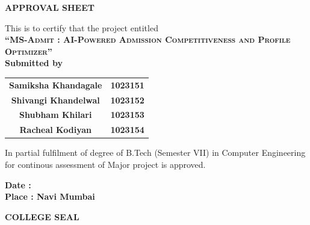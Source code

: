 

\begin{center}

{\LARGE\bf APPROVAL SHEET}

\vspace{0.8cm}

{\large This is to certify that the project entitled}\\[0.3cm]

{\Large\bf \textsc{``MS-Admit : AI-Powered Admission Competitiveness and Profile Optimizer''}}\\[0.4cm]

{\large\bf Submitted by}\\[0.4cm]

\begin{table}[h]
\centering
\Large
\begin{tabular}{cc}
\textbf{Samiksha Khandagale} & \textbf{1023151} \\
\textbf{Shivangi Khandelwal} & \textbf{1023152} \\
\textbf{Shubham Khilari} & \textbf{1023153} \\
\textbf{Racheal Kodiyan} & \textbf{1023154}
\end{tabular}
\end{table}

\vspace{0.8cm}

{\large
In partial fulfilment of degree of B.Tech (Semester VII) in Computer
Engineering for continous assessment  of Major project is approved.
\par
}

\vspace{1.2cm}


\begin{flushleft}
\textbf{Date : }\\[0.2cm]
\textbf{Place : Navi Mumbai} 
\end{flushleft}

\textbf{COLLEGE SEAL}

\vspace{1.8cm}

\end{center}

